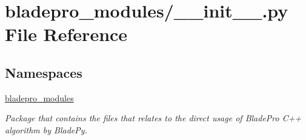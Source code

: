 \hypertarget{a00311}{}\section{bladepro\+\_\+modules/\+\_\+\+\_\+init\+\_\+\+\_\+.py File Reference}
\label{a00311}
\subsection*{Namespaces}
\begin{DoxyCompactItemize}
\item 
 \hyperlink{a00047}{bladepro\+\_\+modules}
\begin{DoxyCompactList}\small\item\em Package that contains the files that relates to the direct usage of Blade\+Pro C++ algorithm by Blade\+Py. \end{DoxyCompactList}\end{DoxyCompactItemize}
